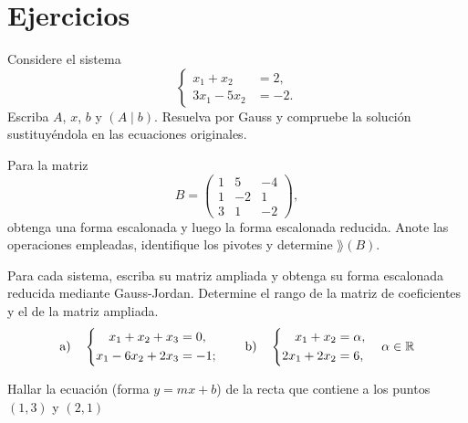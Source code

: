 \documentclass[compacto,10pt]{pubciencias-notas}
\begin{document}
\section{Ejercicios}
\begin{ejer}
Considere el sistema
\[
\left\{\begin{aligned}x_1+x_2&=2,\\3x_1-5x_2&=-2.\end{aligned}\right.
\]
Escriba $A$, $x$, $b$ y $(A\mid b)$. Resuelva por Gauss y compruebe la
solución sustituyéndola en las ecuaciones originales.
\end{ejer}

\begin{ejer}
Para la matriz
\[
B=\begin{pmatrix}1&5&-4\\1&-2&1\\3&1&-2\end{pmatrix},
\]
obtenga una forma escalonada y luego la forma escalonada reducida. Anote
las operaciones empleadas, identifique los pivotes y determine $\rang(B)$.
\end{ejer}

\begin{ejer}
Para cada sistema, escriba su matriz ampliada y obtenga su forma escalonada
reducida mediante Gauss-Jordan. Determine el rango de la matriz de
coeficientes y el de la matriz ampliada.
\[
\text{a)}\quad\left\{\begin{aligned}
x_1+x_2+x_3&=0,\\x_1-6x_2+2x_3&=-1;
\end{aligned}\right.
\qquad
\text{b)}\quad\left\{\begin{aligned}
x_1+x_2&=\alpha,\\2x_1+2x_2&=6,
\end{aligned}\right. \quad \alpha\in\mathbb{R}
\]
\end{ejer}

\begin{ejer}[Aplicación]
Hallar la ecuación (forma $y=mx+b$) de la recta que contiene a los puntos $(1,3)$ y $(2,1)$    
\end{ejer}
\end{document}
